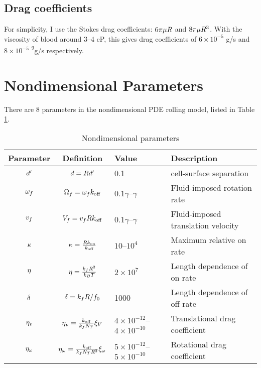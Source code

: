 \documentclass{article}
\begin{document}
\subsection{Drag coefficients}
\label{sec:drag-coefficients}

For simplicity, I use the Stokes drag coefficients:
$6\pi\mu R$ and $8\pi\mu R^3$. With the
viscosity of blood around 3–4 cP, this gives drag coefficients of $6
\times 10^{-5}$ g/s and $8 \times 10^{-5}$
\textmugreek\textsuperscript{2}g/s respectively.

\section{Nondimensional Parameters}
\label{sec:nd-params}

There are 8 parameters in the nondimensional PDE rolling model, listed
in Table \ref{tab:nd-params}.

\begin{table}
  \centering
  \begin{tabular}{c|c|l|l}
    Parameter & Definition & Value & Description \\ \hline
    $d'$ & $d = Rd'$ & 0.1
                                   & cell-surface separation \\
    $\omega_f$ & $\Omega_f = \omega_fk_\text{off}$
                           & $0.1\gamma$--$\gamma$ & Fluid-imposed
                                                     rotation rate \\
    $v_f$ & $V_f = v_fRk_\text{off}$
                           & $0.1\gamma$--$\gamma$
                                   & Fluid-imposed translation
                                     velocity \\
    $\kappa$ & $\kappa = \frac{Rk_\text{on}}{k_\text{off}}$
                           & $10$--$10^4$ & Maximum relative on rate \\
    $\eta$ & $\eta =
                    \frac{k_fR^2}{k_BT}$
                           & $2 \times 10^7$ & Length dependence of on
                                               rate \\
    $\delta$ & $\delta = k_fR/f_0$
                           & 1000 & Length dependence of off rate \\
    $\eta_v$ & $\eta_v =
                     \frac{k_\text{off}}{k_fN_T}
                     \xi_V$ & $4 \times 10^{-12}$--$4 \times
                                     10^{-10}$
                                   & Translational drag coefficient \\
    $\eta_\omega$ & $\eta_\omega =
                     \frac{k_\text{off}}{k_fN_T
                                      R^2}\xi_\omega$
                           & $5 \times 10^{-12}$--$5 \times 10^{-10}$
                                   & Rotational drag coefficient
  \end{tabular}
  \caption{Nondimensional parameters}
  \label{tab:nd-params}
\end{table}


\end{document}
